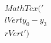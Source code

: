 \documentclass[preview]{standalone}
\begin{document}
\begin{align*}
MathTex('\\lVert y_0 - y_3 \\rVert')
\end{align*}
\end{document}
